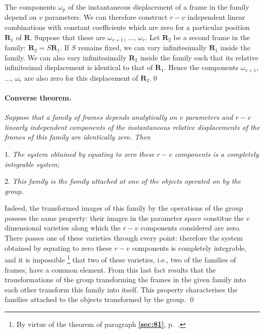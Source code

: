 \documentclass[leqno,11pt]{book}
\numberwithin{equation}{chapter}
\theoremstyle{shape1}
\theoremstyle{shapesmall}
\newcommand{\fsref}[1]{{\rm\textsection\textbf{\ref{sec:#1}}}}
\newcommand{\somespace}{\vspace{9pt}}
\begin{document}
\somespace

The components $\omega_{p}$ of the instantaneous displacement of a frame in the family depend on $v$ parameters. We can therefore construct $r-v$ independent linear combinations with constant coefficients which are zero for a particular position $\mathbf{R}_{1}$ of $\mathbf{R}$. Suppose that these are $\omega_{v+1}$, $\dots$, $\omega_{r}$. Let $\mathbf{R}_{2}$ be a second frame in the family: $\mathbf{R}_{2}=S\mathbf{R}_{1}$. If $S$ remains fixed, we can vary infinitesimally $\mathbf{R}_{1}$ inside the family.  We can also vary infinitesimally $\mathbf{R}_{2}$ inside the family such that its relative infinitesimal displacement is identical to that of $\mathbf{R}_{1}$. Hence the components $\omega_{v+1}$, $\dots$, $\omega_{r}$ are also zero for this displacement of $\mathbf{R}_{2}$.\qed

\paragraph{Converse theorem.}
\label{sec:124}
\emph{Suppose that a family of frames depends analytically on $v$ parameters and $r-v$ linearly independent components of the instantaneous relative displacements of the frames of this family are identically zero. Then}

\somespace

1. \emph{The system obtained by equating to zero these $r-v$ components is a completely integrable system;}

2. \emph{This family is the family attached at one of the objects operated on by the group.}

\somespace

Indeed, the transformed images of this family by the operations of the group possess the same property: their images in the parameter space constitue the $v$ dimensional varieties along which the $r-v$ components considered are zero. There passes one of these varieties through every point: therefore the system obtained by equating to zero these $r-v$ components is completely integrable, and it is impossible \footnote{By virtue of the theorem of paragraph \fsref{81}, p.~\pageref{sec:81}.} that two of these varieties, i.e., two of the families of frames, have a common element. From this last fact results that the transformations of the group transforming the frames in the given family into each other transform this family into itself. This property characterises the families attached to the objects transformed by the group. \qed
\end{document}
